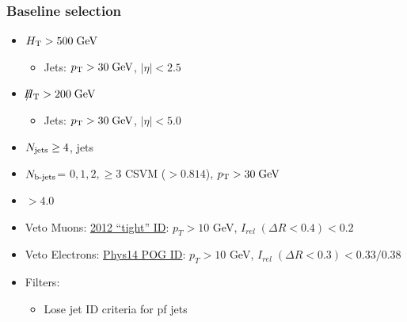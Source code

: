 \documentclass{beamer}
\begin{document}
\begin{frame}
\frametitle{Baseline selection}
\normalsize
\begin{itemize}
 \item $H_{\text{T}} >500 \;\text{Ge}\kern-0.06667em\text{V}$
 \begin{itemize}
       \item Jets: $p_{\text{T}}>30\;\text{Ge}\kern-0.06667em\text{V}$, $|\eta|<2.5$ 
      \end{itemize}
 \item $\slash\mkern-12mu{H}_{\text{T}} >200 \;\text{Ge}\kern-0.06667em\text{V}$
  \begin{itemize}
       \item Jets: $p_{\text{T}}>30\;\text{Ge}\kern-0.06667em\text{V}$, $|\eta|<5.0$
      \end{itemize}
 \item $N_{\text{jets}}\ge 4$, \HT jets
 \item $N_{\text{b-jets}}$= {$0,1,2,\geq3$} CSVM ($>0.814$), $p_{\text{T}}>30\;\text{Ge}\kern-0.06667em\text{V}$
\item  \dphin $> 4.0$
\item Veto Muons: \href{https://twiki.cern.ch/twiki/bin/view/CMSPublic/SWGuideMuonId\#Tight\_Muon}{2012 ``tight'' ID}: $p_T > 10$ GeV, $I_{rel}\; (\Delta R<0.4) < 0.2$    
    \item Veto Electrons: \href{https://twiki.cern.ch/twiki/bin/viewauth/CMS/CutBasedElectronIdentificationRun2\#CSA14\_selection\_conditions\_25ns}{Phys14 POG ID}:  $p_T > 10$ GeV, $I_{rel}\;
      (\Delta R<0.3) < 0.33 / 0.38$
      \item Filters:
      \begin{itemize}
       \item Lose jet ID criteria for pf jets
      \end{itemize}

% 
% 
\end{itemize}
\end{frame}


\setcounter{framenumber}{7}
\end{document}
